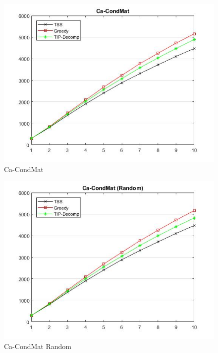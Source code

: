 \begin{figure}
	\centering
	\includegraphics[scale=0.5]{images/ca-condmatresult.jpg}
	\caption{Ca-CondMat}
	\end{figure}
\begin{figure}
	\centering	
	\includegraphics[scale=0.5]{images/ca-condmatresultrandom.jpg}
	\caption{Ca-CondMat Random}
	\end{figure}
